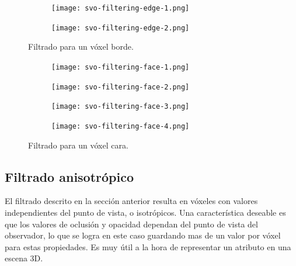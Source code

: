 \begin{figure}
    \begin{center}
        \begin{subfigure}{.24\textwidth}
            \texttt{[image: svo-filtering-edge-1.png]}
        \end{subfigure}
        \begin{subfigure}{.24\textwidth}
            \texttt{[image: svo-filtering-edge-2.png]}
        \end{subfigure}
    \end{center}
    \caption{Filtrado para un vóxel borde.}
    \label{fig:svo_filtering_edges}
\end{figure}

\begin{figure}
    \begin{center}
        \begin{subfigure}{.24\textwidth}
            \texttt{[image: svo-filtering-face-1.png]}
        \end{subfigure}
        \begin{subfigure}{.24\textwidth}
            \texttt{[image: svo-filtering-face-2.png]}
        \end{subfigure}
        \begin{subfigure}{.24\textwidth}
            \texttt{[image: svo-filtering-face-3.png]}
        \end{subfigure}
        \begin{subfigure}{.24\textwidth}
            \texttt{[image: svo-filtering-face-4.png]}
        \end{subfigure}
    \end{center}
    \caption{Filtrado para un vóxel cara.}
    \label{fig:svo_filtering_faces}
\end{figure}


\subsection{Filtrado anisotrópico}

El filtrado descrito en la sección anterior resulta en vóxeles con valores independientes del punto de vista, o isotrópicos.
Una característica deseable es que los valores de oclusión y opacidad dependan del punto de vista del observador, lo que se logra en este caso guardando mas de un valor por vóxel para estas propiedades.
Es muy útil a la hora de representar un atributo en una escena 3D.

